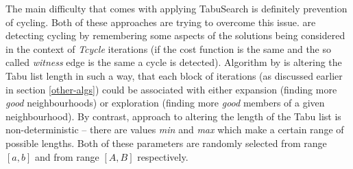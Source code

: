 \documentclass[14pt]{article}
\begin{document}
The main difficulty that comes with applying TabuSearch is definitely prevention of cycling. Both of these approaches are trying to overcome this issue. \citet{amico-trubian} are detecting cycling by remembering some aspects of the solutions being considered in the context of \textit{Tcycle} iterations (if the cost function is the same and the so called \textit{witness} edge is the same a cycle is detected). Algorithm by \citet{pezzella} is altering the Tabu list length in such a way, that each block of iterations (as discussed earlier in section \ref{other-algs}) could be associated with either expansion (finding more \textit{good} neighbourhoods) or exploration (finding more \textit{good} members of a given neighbourhood). By contrast, \citet{amico-trubian} approach to altering the length of the Tabu list is non-deterministic – there are values \textit{min} and \textit{max} which make a certain range of possible lengths. Both of these parameters are randomly selected from range $[a,b]$ and from range $[A,B]$ respectively.



\end{document}

